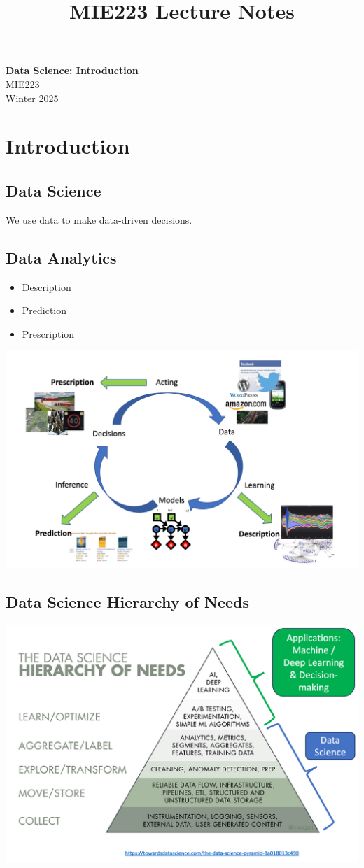\documentclass[11pt]{article}
\theoremstyle{definition}
\begin{document}
\setcounter{section}{0}
\title{MIE223 Lecture Notes}

\thispagestyle{empty}

\begin{center}
{\LARGE \bf Data Science: Introduction}\\
{\large MIE223}\\
Winter 2025
\end{center}
\section{Introduction}
\subsection{Data Science}
We use data to make data-driven decisions.
\subsection{Data Analytics}
\begin{itemize}
  \item Description
  \item Prediction
  \item Prescription
\end{itemize}
\includegraphics[width=\textwidth]{2.png}
\subsection{Data Science Hierarchy of Needs}
\includegraphics[width=\textwidth]{3.png}
\newpage
\end{document}

